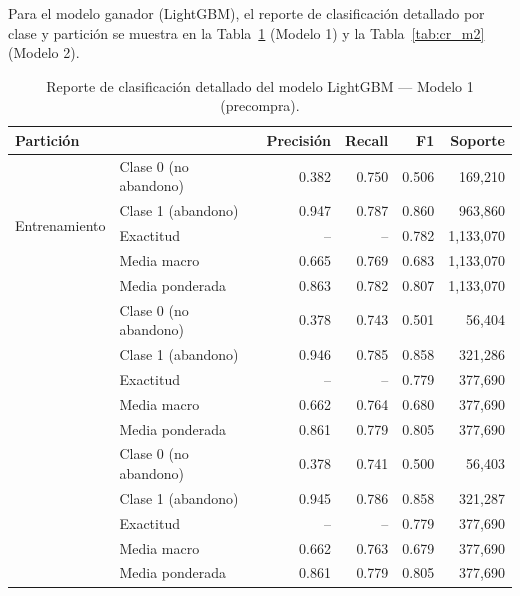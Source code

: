 \documentclass[11pt,letterpaper]{article}
\begin{document}
Para el modelo ganador (LightGBM), el reporte de clasificación detallado por clase y partición se muestra en la Tabla~\ref{tab:cr_m1} (Modelo 1) y la Tabla~\ref{tab:cr_m2} (Modelo 2).

\begin{table}[h!]
\centering
\footnotesize
\caption{Reporte de clasificación detallado del modelo LightGBM --- Modelo 1 (precompra).}
\label{tab:cr_m1}
\begin{tabular}{@{}llrrrr@{}}
\toprule
Partición & & Precisión & Recall & F1 & Soporte \\
\midrule
\multirow{5}{*}{Entrenamiento}
  & Clase 0 (no abandono) & 0.382 & 0.750 & 0.506 & 169{,}210 \\
  & Clase 1 (abandono)    & 0.947 & 0.787 & 0.860 & 963{,}860 \\
  & Exactitud             & --    & --    & 0.782 & 1{,}133{,}070 \\
  & Media macro           & 0.665 & 0.769 & 0.683 & 1{,}133{,}070 \\
  & Media ponderada       & 0.863 & 0.782 & 0.807 & 1{,}133{,}070 \\
\addlinespace
\multirow{5}{*}{Validación}
  & Clase 0 (no abandono) & 0.378 & 0.743 & 0.501 & 56{,}404 \\
  & Clase 1 (abandono)    & 0.946 & 0.785 & 0.858 & 321{,}286 \\
  & Exactitud             & --    & --    & 0.779 & 377{,}690 \\
  & Media macro           & 0.662 & 0.764 & 0.680 & 377{,}690 \\
  & Media ponderada       & 0.861 & 0.779 & 0.805 & 377{,}690 \\
\addlinespace
\multirow{5}{*}{Prueba}
  & Clase 0 (no abandono) & 0.378 & 0.741 & 0.500 & 56{,}403 \\
  & Clase 1 (abandono)    & 0.945 & 0.786 & 0.858 & 321{,}287 \\
  & Exactitud             & --    & --    & 0.779 & 377{,}690 \\
  & Media macro           & 0.662 & 0.763 & 0.679 & 377{,}690 \\
  & Media ponderada       & 0.861 & 0.779 & 0.805 & 377{,}690 \\
\bottomrule
\end{tabular}
\end{table}
\end{document}
